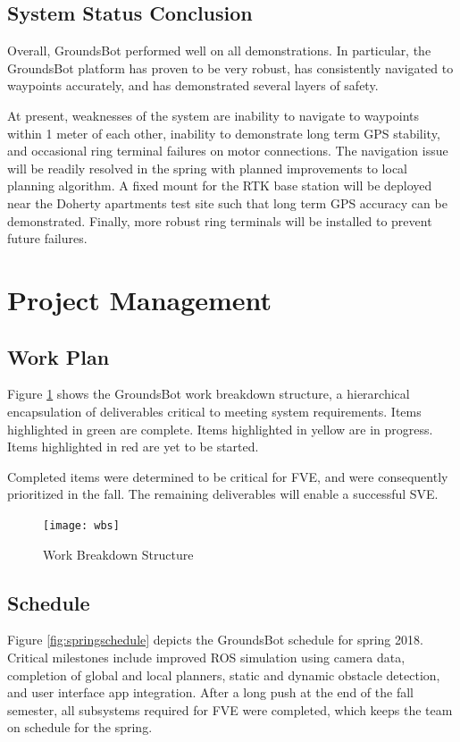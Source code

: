 \documentclass[12pt]{extarticle}
\begin{document}
  \subsection{System Status Conclusion}
  Overall, GroundsBot performed well on all demonstrations. In particular, the GroundsBot platform has proven to be very robust, has consistently navigated to waypoints accurately, and has demonstrated several layers of safety.

At present, weaknesses of the system are inability to navigate to waypoints within 1 meter of each other, inability to demonstrate long term GPS stability, and occasional ring terminal failures on motor connections. The navigation issue will be readily resolved in the spring with planned improvements to local planning algorithm. A fixed mount for the RTK base station will be deployed near the Doherty apartments test site such that long term GPS accuracy can be demonstrated. Finally, more robust ring terminals will be installed to prevent future failures.

\section{Project Management}
\subsection{Work Plan}
Figure \ref{fig:wbs} shows the GroundsBot work breakdown structure, a hierarchical encapsulation of deliverables critical to meeting system requirements. Items highlighted in green are complete. Items highlighted in yellow are in progress. Items highlighted in red are yet to be started.
  
  Completed items were determined to be critical for FVE, and were consequently prioritized in the fall. The remaining deliverables will enable a successful SVE.
\begin{figure}[H]
\centering
\def\svgwidth{\columnwidth}
\texttt{[image: wbs]}
\caption{Work Breakdown Structure}
\label{fig:wbs}
\end{figure}

  
\subsection{Schedule}
Figure \ref{fig:springschedule} depicts the GroundsBot schedule for spring 2018. Critical milestones include improved ROS simulation using camera data, completion of global and local planners, static and dynamic obstacle detection, and user interface app integration.  
	After a long push at the end of the fall semester, all subsystems required for FVE were completed, which keeps the team on schedule for the spring.
\end{document}
